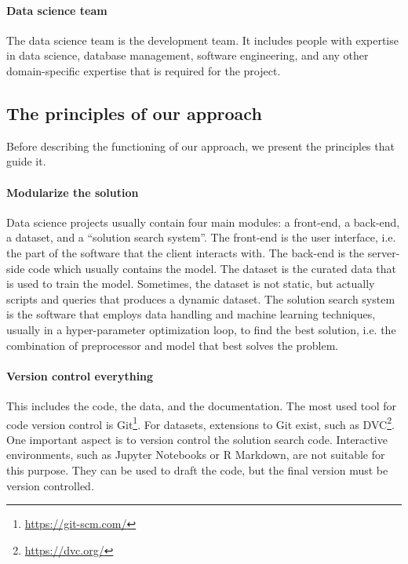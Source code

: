 \paragraph{Data science team}  The data science team is the development team.  It includes
people with expertise in data science, database management, software engineering, and any
other domain-specific expertise that is required for the project.

\subsection{The principles of our approach}

Before describing the functioning of our approach, we present the principles that guide it.

\paragraph{Modularize the solution}

Data science projects usually contain four main modules: a front-end, a back-end, a
dataset, and a ``solution search system''.  The front-end is the user interface, i.e.
the part of the software that the client interacts with.  The back-end is the server-side
code which usually contains the model.  The dataset is the curated data that is used to train the
model.  Sometimes, the dataset is not static, but actually scripts and queries that
produces a dynamic dataset.  The solution search system is the software that employs data
handling and machine learning techniques, usually in a hyper-parameter optimization loop,
to find the best solution, i.e. the combination of preprocessor and model that best
solves the problem.

\paragraph{Version control everything}

This includes the code, the data, and the
documentation. The most used tool for code version control is
Git\footnote{\url{https://git-scm.com/}}.  For datasets,
extensions to Git exist, such as DVC\footnote{\url{https://dvc.org/}}.  One important aspect
is to version control the solution search code.  Interactive environments, such as Jupyter
Notebooks or R Markdown, are not suitable for this purpose.  They can be used to draft the code, but
the final version must be version controlled.

